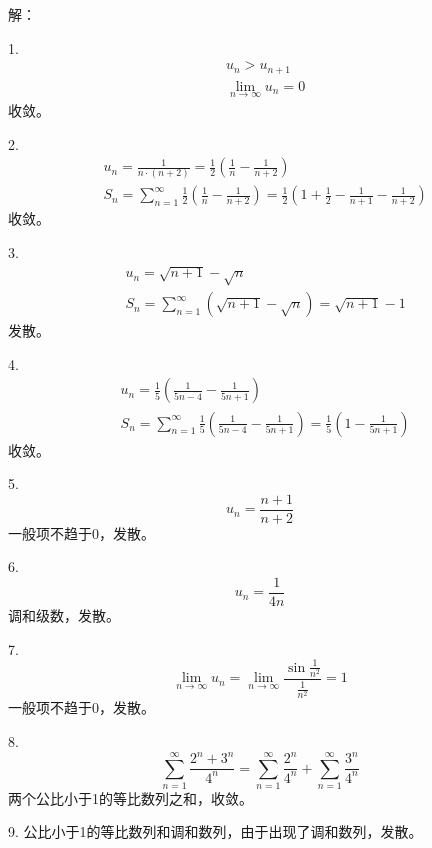 解：

1.
\begin{align*}
&u_n>u_{n+1} \\
&\underset{n\rightarrow \infty}{\lim}u_n=0
\end{align*}
收敛。

2.
\begin{align*}
&u_n=\frac{1}{n\cdot \left( n+2 \right)}=\frac{1}{2}\left( \frac{1}{n}-\frac{1}{n+2} \right) \\
&S_n=\sum_{n=1}^{\infty}{\frac{1}{2}\left( \frac{1}{n}-\frac{1}{n+2} \right)}=\frac{1}{2}\left( 1+\frac{1}{2}-\frac{1}{n+1}-\frac{1}{n+2} \right)
\end{align*}
收敛。

3.
\begin{align*}
&u_n=\sqrt{n+1}-\sqrt{n} \\
&S_n=\sum_{n=1}^{\infty}{\left( \sqrt{n+1}-\sqrt{n} \right)}=\sqrt{n+1}-1
\end{align*}
发散。

4.
\begin{align*}
&u_n=\frac{1}{5}\left( \frac{1}{5n-4}-\frac{1}{5n+1} \right) \\
&S_n=\sum_{n=1}^{\infty}{\frac{1}{5}\left( \frac{1}{5n-4}-\frac{1}{5n+1} \right)}=\frac{1}{5}\left( 1-\frac{1}{5n+1} \right)
\end{align*}
收敛。

5.
\[
u_n=\frac{n+1}{n+2}
\]
一般项不趋于0，发散。

6.
\[
u_n=\frac{1}{4n}
\]
调和级数，发散。

7.
\[
\underset{n\rightarrow \infty}{\lim}u_n=\underset{n\rightarrow \infty}{\lim}\frac{\sin \frac{1}{n^2}}{\frac{1}{n^2}}=1
\]
一般项不趋于0，发散。

8.
\[
\sum_{n=1}^{\infty}{\frac{2^n+3^n}{4^n}}=\sum_{n=1}^{\infty}{\frac{2^n}{4^n}}+\sum_{n=1}^{\infty}{\frac{3^n}{4^n}}
\]
两个公比小于1的等比数列之和，收敛。

9.
公比小于1的等比数列和调和数列，由于出现了调和数列，发散。




